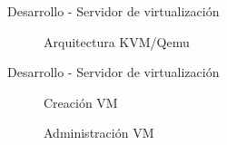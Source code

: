 \begin{frame}{Desarrollo - Servidor de virtualización}
\begin{figure}[!tbp]
\begin{minipage}[b]{0.4\textwidth}
        \caption{\scriptsize Arquitectura KVM/Qemu}
      \end{minipage}
    \end{figure}


\end{frame}


\begin{frame}{Desarrollo - Servidor de virtualización}
    \begin{figure}[!tbp]
      \centering
      \begin{minipage}[b]{0.4\textwidth}
        \caption{\scriptsize Creación VM}
      \end{minipage}
      \hfill
      \begin{minipage}[b]{0.4\textwidth}
        \caption{\scriptsize Administración VM}
      \end{minipage}
    \end{figure}


\end{frame}


